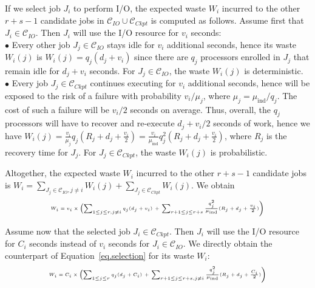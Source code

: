 \documentclass[conference,nofonttune]{IEEEtran}
\newcommand{\muind}{\mu_{\text{ind}}}
\newcommand{\ckpt}[1]{C_{#1}}
\newcommand{\reco}[1]{R_{#1}}
\newcommand{\wap}[1]{W_{#1}}
\newcommand{\wapp}[2]{W_{#1}(#2)}
\newcommand{\Catiocat}{\mathcal{C}_{IO}\xspace}
\newcommand{\Catckptcat}{\mathcal{C}_{Ckpt}\xspace}
\begin{document}
If we select job $J_{i}$ to perform I/O, the expected waste $\wap{i}$
incurred to the other $r+s-1$ candidate jobs in  $\Catiocat \cup
\Catckptcat$ is computed as follows. Assume first that $J_{i} \in \Catiocat$.
Then  $J_{i}$ will use the I/O resource for $v_{i}$ seconds:\\
$\bullet$ Every other job $J_{j} \in \Catiocat$ stays idle for $v_{i}$
  additional seconds, hence its waste $\wapp{i}{j}$ is $\wapp{i}{j} = q_{j}
  (d_{j} + v_{i})$ since there are $q_{j}$ processors enrolled in $J_{j}$ that
  remain idle for $d_{j} + v_{i}$ seconds. For $J_{j} \in \Catiocat$, the
  waste $\wapp{i}{j}$ is deterministic.\\
$\bullet$ Every job $J_{j} \in \Catckptcat$ continues executing for
  $v_{i}$ additional seconds, hence will be exposed to the risk of a failure
  with probability $v_{i}/\mu_{j}$, where $\mu_{j} =
  \muind/q_{j}$. The cost of such a failure will be $v_{i}/2$ seconds on average.
  Thus, overall, the $q_{j}$ processors will have to recover and re-execute $d_{j} +
  v_{i}/2$ seconds of work, hence we have $\wapp{i}{j} =
  \frac{v_{i}}{\mu_{j} } q_{j} (\reco{j} + d_{j} + \frac{v_{i}}{2}) =
  \frac{v_{i}}{\muind} q^{2}_{j} (\reco{j} + d_{j} + \frac{v_{i}}{2})$, where
  $\reco{j}$ is the recovery time for $J_{j}$. For $J_{j} \in
  \Catckptcat$, the waste $\wapp{i}{j}$ is probabilistic.

 Altogether, the expected waste $\wap{i}$ incurred
to the other $r+s-1$ candidate jobs is
$\wap{i} = \sum_{J_{j} \in \Catiocat, j\neq i} \wapp{i}{j} + \sum_{J_{j} \in \Catckptcat} \wapp{i}{j}$.
We obtain
\begin{equation}
\label{eq.selection}
{\tiny
\begin{array}{l}
 \wap{i} =  v_{i} \times \left( \sum_{1 \leq j \leq r, j\neq i} q_{j} (d_{j} + v_{i}) \right.
 + \left. \sum_{r+1 \leq j \leq r+s}   \frac{q^{2}_{j}}{\muind} (\reco{j} + d_{j} + \frac{v_{i}}{2}) \right)
 \end{array}
 }
\end{equation}

Assume now that the selected job $J_{i} \in \Catckptcat$. Then $J_{i}$
will use the I/O resource for $\ckpt{i}$ seconds instead of $v_{i}$
seconds for $J_{i} \in \Catiocat$. We directly obtain the counterpart
of Equation~\eqref{eq.selection} for its waste $\wap{i}$:
 \begin{equation}
\label{eq.selection2}
{\tiny
 \begin{array}{l}
 \wap{i} = \ckpt{i} \times \left( \sum_{1 \leq j \leq r} q_{j} (d_{j} + \ckpt{i}) \right.
+ \left. \sum_{r+1 \leq j \leq r+s, j\neq i}   \frac{q^{2}_{j}}{\muind} (\reco{j} + d_{j} + \frac{C_{i}}{2}) \right)
 \end{array}
 }
\end{equation}
\end{document}
